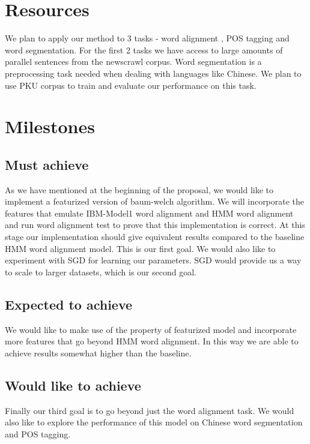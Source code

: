 \documentclass[11pt]{article}
\begin{document}
\section{Resources}
We plan to apply our method to 3 tasks - word alignment , POS tagging and word segmentation. For the first 2 tasks we have access to large amounts of parallel sentences from the newscrawl corpus. Word segmentation is a preprocessing task needed when dealing with languages like Chinese. We plan to use PKU corpus to train and evaluate our performance on this task.

\section{Milestones}
\subsection{Must achieve}
As we have mentioned at the beginning of the proposal, we would like to implement a featurized version of baum-welch algorithm. We will incorporate the features that emulate IBM-Model1 word alignment and HMM word alignment and run word alignment test to prove that this implementation is correct. At this stage our implementation should give equivalent results compared to the baseline HMM word alignment model. This is our first goal. We would also like to experiment with SGD for learning our parameters. SGD would provide us a way to scale to larger datasets, which is our second goal.

\subsection{Expected to achieve}
We would like to make use of the property of featurized model and incorporate more features that go beyond HMM word alignment. In this way we are able to achieve results somewhat higher than the baseline.

\subsection{Would like to achieve}
Finally our third goal is to go beyond just the word alignment task. We would also like to explore the performance of this model on Chinese word segmentation and POS tagging.
\end{document}
